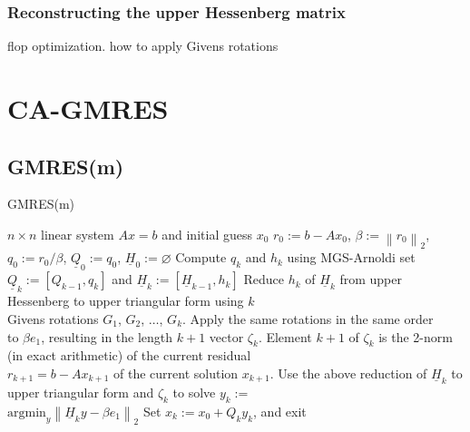 \documentclass{scrartcl}
\newcommand{\norm}[1]{\left\lVert#1\right\rVert}
\begin{document}
\subsubsection{Reconstructing the upper Hessenberg matrix}
flop optimization. how to apply Givens rotations

\section{CA-GMRES} \label{sec:ca-gmres}


\subsection{GMRES(m)}
\begin{algorithm}[H]
\caption{GMRES(m)}
\label{alg:gmres(m)}
\begin{algorithmic}[1]
    \REQUIRE $n \times n$ linear system $Ax = b$ and initial guess $x_0$
    \STATE $r_0:=b-Ax_0$, $\beta := \norm{r_0}_2$, $q_0 := r_0/\beta$, $\underline{Q}_0 := q_0$, $\underline{H}_0 := \varnothing$
		\STATE Compute $q_k$ and $h_k$ using MGS-Arnoldi
		\STATE set $\underline{Q}_k := [Q_{k-1},q_k]$ and $\underline{H}_k := [\underline{H}_{k -1}, h_k]$
		\STATE Reduce ${h_k}$ of $\underline{H}_k$ from upper Hessenberg to upper triangular form using $k$ \\
		\hspace{\algorithmicindent} Givens rotations $G_1$, $G_2$, $ \ldots$, $G_{k}$. Apply the same rotations in the same order \\ 
		\hspace{\algorithmicindent} to $\beta e_1$,  resulting in the length $k + 1$ vector $\zeta_{k}$.
		\STATE Element $k + 1$ of $\zeta_k$ is the 2-norm (in exact arithmetic) of the current residual \\
\hspace{\algorithmicindent} $r_{k + 1} = b - Ax_{k + 1}$ of the current solution $x_{k + 1}$.
		\STATE Use the above reduction of $\underline{H}_k$ to upper triangular form and $\zeta_k$ to solve $y_k :=$ \\ \hspace{\algorithmicindent} $\text{argmin}_{y} \norm{\underline{H}_k y - \beta e_1}_2$
		\STATE Set $x_k := x_0 + Q_k y_k$, and exit
	\ENDIF
	\ENDFOR 
\end{algorithmic}
\end{algorithm}
\end{document}
